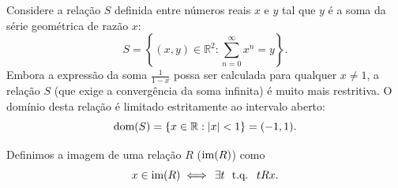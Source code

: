 

\begin{exemplo}
    Considere a relação \(S\) definida entre números reais \(x\) e \(y\) tal que \(y\) é a soma da série geométrica de razão \(x\):
    \[
        S = \left\{(x, y) \in \mathbb{R}^2 : \sum_{n=0}^{\infty} x^n = y\right\}.
    \]
    Embora a expressão da soma \(\frac{1}{1-x}\) possa ser calculada para qualquer \(x \neq 1\), a relação \(S\) (que exige a convergência da soma infinita) é muito mais restritiva. O domínio desta relação é limitado estritamente ao intervalo aberto:
    \[
        \text{dom}(S) = \{x \in \mathbb{R} : |x| < 1\} = (-1, 1).
    \]
\end{exemplo}

\begin{definicao}[Imagem]
    \label{def:imagem}
    Definimos a imagem de uma relação \(R\) (\(\text{im} (R)\)) como
    \[
        x \in \im (R) \iff \exists t \tq tRx.
    \]
\end{definicao}








